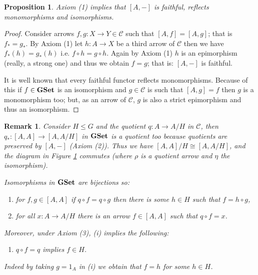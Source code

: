 \documentclass[italian, 12pt, reqno]{article}
\theoremstyle{myteo}
\newtheorem{proposition}[theorem]{Proposition}
\newtheorem{remark}[theorem]{Remark}
\numberwithin{equation}{section}
\newcommand{\cat}[1]{\mathscr{#1}}
\newcommand{\gset}{\text{\textbf{GSet}}}
\newcommand{\homs}[2]{[#1, #2]}
\newcommand{\fun}[3]{#1\colon#2\to #3}
\begin{document}
\begin{proposition}
  \label{prop:hom_is_faithful}
  Axiom (1) implies that \(\homs{A}{-}\) is faithful, reflects monomorphisms and isomorphisms.
\end{proposition}

\begin{proof}
  Consider arrows \(\fun{f,g}{X}{Y}\in\cat{C}\) such that \(\homs{A}{f} = \homs{A}{g}\); that is \(f_* = g_*\).
  By Axiom (1) let \(\fun{h}{A}{X}\) be a third arrow of \(\cat{C}\) then we have \(f_*(h) = g_*(h)\) i.e. \(f\circ h = g\circ h\).
  Again by Axiom (1) \(h\) is an epimorphism (really, a strong one) and thus we obtain \(f = g\); that is: \(\homs{A}{-}\) is faithful.
  
  It is well known that every faithful functor reflects monomorphisms.
  Because of this if \(f\in\gset\) is an isomorphism and \(g\in\cat{C}\) is such that \(\homs{A}{g} = f\) then \(g\) is a monomorphism too; but, as an arrow of \(\cat{C}\), \(g\) is also a strict epimorphism and thus an isomorphism.
\end{proof}

\begin{remark}
  \label{rem:axiom1}
  Consider \(H\leq G\) and the quotient \(\fun{q}{A}{A/H}\) in \(\cat{C}\), then \(\fun{q_*}{\homs{A}{A}}{\homs{A}{A/H}}\) in \(\gset\) is a quotient too because quotients are preserved by \(\homs{A}{-}\) (Axiom (2)).
	Thus we have \(\homs{A}{A}/H \cong \homs{A}{A/H}\), and the diagram in Figure \ref{diagram:eta} commutes (where \(\rho\) is a quotient arrow and \(\eta\) the isomorphism).

  \begin{figure}
    \begin{center}
    \end{center}
    \caption{}
    \label{diagram:eta}
  \end{figure}

	Isomorphisms in \(\gset\) are bijections so:
  \begin{enumerate}
  \item[(i)] for \(f, g\in \homs{A}{A}\) if \(q\circ f = q\circ g\) then there is some \(h\in H\) such that \(f = h\circ g\),
  \item[(ii)] for all \(\fun{x}{A}{A/H}\) there is an arrow \(f\in\homs{A}{A}\) such that \(q\circ f = x\).
  \end{enumerate}
  Moreover, under Axiom (3), (i) implies the following:
  \begin{enumerate}
  \item[(iii)] \(q\circ f = q\) implies \(f\in H\).
  \end{enumerate}
  Indeed by taking \(g = 1_A\) in (i) we obtain that \(f = h\) for some \(h\in H\).
\end{remark}
\end{document}
